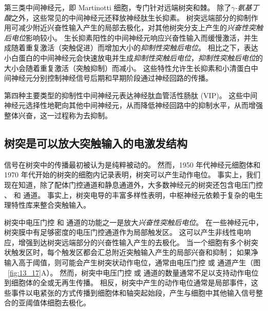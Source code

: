 第三类中间神经元，即 Martinotti 细胞，专门针对远端树突和棘。
除了\textit{$\gamma$-氨基丁酸}之外，这些常见的中间神经元还释放神经肽生长抑素。
树突远端部分的抑制作用可减少附近兴奋性输入产生的局部去极化，对其他树突分支上产生的\textit{兴奋性突触后电位}影响较小。
生长抑素阳性的中间神经元响应兴奋性输入而缓慢激活，并生成随着重复激活（突触促进）而增加大小的\textit{抑制性突触后电位}。 
相比之下，表达小白蛋白的中间神经元会快速放电并生成\textit{抑制性突触后电位}，\textit{抑制性突触后电位}的大小会随着重复激活（突触抑制）而减小。
这些特性允许生长抑素和小清蛋白中间神经元分别控制神经信号后期和早期阶段通过神经回路的传播。


第四种主要类型的抑制性中间神经元表达神经肽血管活性肠肽 (VIP)。
这些中间神经元选择性地靶向其他中间神经元，从而降低神经回路中的抑制水平，从而增强整体兴奋，这一过程称为去抑制。



\subsection{树突是可以放大突触输入的电激发结构}

信号在树突中的传播最初被认为是纯粹被动的。
然而，1950 年代神经元细胞体和 1970 年代开始的树突的细胞内记录表明，树突可以产生动作电位。
事实上，我们现在知道，除了配体门控通道和静息通道外，大多数神经元的树突还包含电压门控 、 和  通道。
事实上，树突电导的丰富多样性表明，中枢神经元依赖于复杂的电生理特性库来整合突触输入。


树突中电压门控  和  通道的功能之一是放大\textit{兴奋性突触后电位}。
在一些神经元中，树突膜中有足够密度的电压门控通道作为局部触发区。
这可以产生非线性电响应，增强到达树突远端部分的兴奋性输入产生的去极化。
当一个细胞有多个树突状触发区时，每个触发区都会汇总附近突触输入产生的局部兴奋和抑制；
如果净输入高于阈值，则可能会产生树突状动作电位，通常由电压门控  或  通道产生（图 ~\ref{fig:13_17}A）。
然而，树突中电压门控  或  通道的数量通常不足以支持动作电位到细胞体的全或无再生传播。
相反，树突中产生的动作电位通常是局部事件，这些事件以电紧张的方式传播到细胞体和轴突起始段，产生与细胞中其他输入信号整合的亚阈值体细胞去极化。


